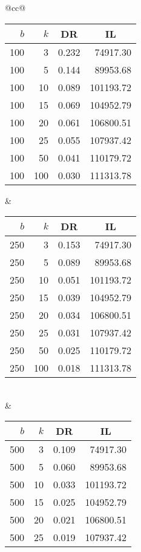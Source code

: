 \begin{table}[H]
	\centering
	\begin{tabular}{@{}cc@{}}
		\begin{tabular}{@{}rrrr@{}}
			\toprule
			$b$ & $k$ & \multicolumn{1}{c}{DR} & \multicolumn{1}{c}{IL} \\ \midrule
			100  & 3   & 0.232 & 74917.30  \\
			100  & 5   & 0.144 & 89953.68  \\
			100  & 10  & 0.089 & 101193.72 \\
			100  & 15  & 0.069 & 104952.79 \\
			100  & 20  & 0.061 & 106800.51 \\
			100  & 25  & 0.055 & 107937.42 \\
			100  & 50  & 0.041 & 110179.72 \\
			100  & 100 & 0.030 & 111313.78 \\ \bottomrule
		\end{tabular}
		&
		\begin{tabular}{@{}rrrr@{}}
			\toprule
			$b$ & $k$ & \multicolumn{1}{c}{DR} & \multicolumn{1}{c}{IL} \\ \midrule
			250  & 3   & 0.153 & 74917.30  \\
			250  & 5   & 0.089 & 89953.68  \\
			250  & 10  & 0.051 & 101193.72 \\
			250  & 15  & 0.039 & 104952.79 \\
			250  & 20  & 0.034 & 106800.51 \\
			250  & 25  & 0.031 & 107937.42 \\
			250  & 50  & 0.025 & 110179.72 \\
			250  & 100 & 0.018 & 111313.78 \\ \bottomrule
		\end{tabular}
		\\ & \\
		\begin{tabular}{@{}rrrr@{}}
			\toprule
			$b$ & $k$ & \multicolumn{1}{c}{DR} & \multicolumn{1}{c}{IL} \\ \midrule
			500  & 3   & 0.109 & 74917.30  \\
			500  & 5   & 0.060 & 89953.68  \\
			500  & 10  & 0.033 & 101193.72 \\
			500  & 15  & 0.025 & 104952.79 \\
			500  & 20  & 0.021 & 106800.51 \\
			500  & 25  & 0.019 & 107937.42 \\

\end{tabular}
\end{tabular}
\end{table}
